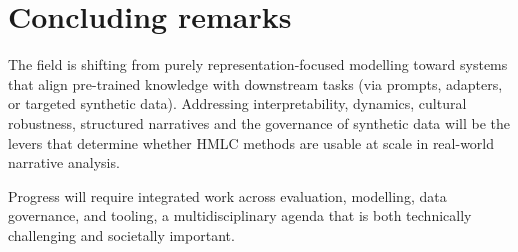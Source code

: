 \section{Concluding remarks}

The field is shifting from purely representation-focused modelling toward systems that align pre-trained knowledge with downstream tasks (via prompts, adapters, or targeted synthetic data). Addressing interpretability, dynamics, cultural robustness, structured narratives and the governance of synthetic data will be the levers that determine whether HMLC methods are usable at scale in real-world narrative analysis.

Progress will require integrated work across evaluation, modelling, data governance, and tooling, a multidisciplinary agenda that is both technically challenging and societally important.